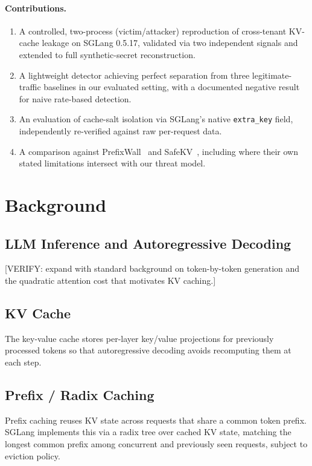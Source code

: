\documentclass[11pt]{article}
\begin{document}
\paragraph{Contributions.}
\begin{enumerate}
  \item A controlled, two-process (victim/attacker) reproduction of
  cross-tenant KV-cache leakage on SGLang 0.5.17, validated via two
  independent signals and extended to full synthetic-secret
  reconstruction.
  \item A lightweight detector achieving perfect separation from three
  legitimate-traffic baselines in our evaluated setting, with a
  documented negative result for naive rate-based detection.
  \item An evaluation of cache-salt isolation via SGLang's native
  \texttt{extra\_key} field, independently re-verified against raw
  per-request data.
  \item A comparison against PrefixWall~\citep{pennas2026prefixwall} and
  SafeKV~\citep{chu2025safekv}, including where their own stated
  limitations intersect with our threat model.
\end{enumerate}

\section{Background}
\subsection{LLM Inference and Autoregressive Decoding}
[VERIFY: expand with standard background on token-by-token generation
and the quadratic attention cost that motivates KV caching.]

\subsection{KV Cache}
The key-value cache stores per-layer key/value projections for
previously processed tokens so that autoregressive decoding avoids
recomputing them at each step.

\subsection{Prefix / Radix Caching}
Prefix caching reuses KV state across requests that share a common
token prefix. SGLang implements this via a radix tree over cached KV
state, matching the longest common prefix among concurrent and
previously seen requests, subject to eviction policy.
\end{document}

